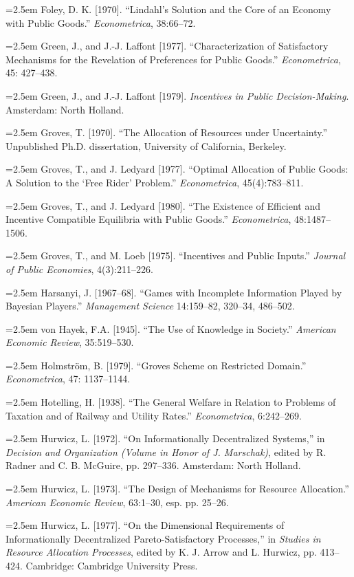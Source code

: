 \documentclass[12pt, letterpaper]{article}
\newcommand{\bibentry}[1]{\noindent\hangindent=2.5em\hangafter=1 \small #1 \par\vspace{0.7em}}
\begin{document}
\bibentry{Foley, D. K. [1970]. ``Lindahl's Solution and the Core of an Economy with Public Goods.'' \textit{Econometrica}, 38:66--72.}

\bibentry{Green, J., and J.-J. Laffont [1977]. ``Characterization of Satisfactory Mechanisms for the Revelation of Preferences for Public Goods.'' \textit{Econometrica}, 45: 427--438.}

\bibentry{Green, J., and J.-J. Laffont [1979]. \textit{Incentives in Public Decision-Making}. Amsterdam: North Holland.}

\bibentry{Groves, T. [1970]. ``The Allocation of Resources under Uncertainty.'' Unpublished Ph.D. dissertation, University of California, Berkeley.}

\bibentry{Groves, T., and J. Ledyard [1977]. ``Optimal Allocation of Public Goods: A Solution to the `Free Rider' Problem.'' \textit{Econometrica}, 45(4):783--811.}

\bibentry{Groves, T., and J. Ledyard [1980]. ``The Existence of Efficient and Incentive Compatible Equilibria with Public Goods.'' \textit{Econometrica}, 48:1487--1506.}

\bibentry{Groves, T., and M. Loeb [1975]. ``Incentives and Public Inputs.'' \textit{Journal of Public Economies}, 4(3):211--226.}

\bibentry{Harsanyi, J. [1967--68]. ``Games with Incomplete Information Played by Bayesian Players.'' \textit{Management Science} 14:159--82, 320--34, 486--502.}

\bibentry{von Hayek, F.A. [1945]. ``The Use of Knowledge in Society.'' \textit{American Economic Review}, 35:519--530.}

\bibentry{Holmström, B. [1979]. ``Groves Scheme on Restricted Domain.'' \textit{Econometrica}, 47: 1137--1144.}


\bibentry{Hotelling, H. [1938]. ``The General Welfare in Relation to Problems of Taxation and of Railway and Utility Rates.'' \textit{Econometrica}, 6:242--269.}

\bibentry{Hurwicz, L. [1972]. ``On Informationally Decentralized Systems,'' in \textit{Decision and Organization (Volume in Honor of J. Marschak)}, edited by R. Radner and C. B. McGuire, pp. 297--336. Amsterdam: North Holland.}

\bibentry{Hurwicz, L. [1973]. ``The Design of Mechanisms for Resource Allocation.'' \textit{American Economic Review}, 63:1--30, esp. pp. 25--26.}

\bibentry{Hurwicz, L. [1977]. ``On the Dimensional Requirements of Informationally Decentralized Pareto-Satisfactory Processes,'' in \textit{Studies in Resource Allocation Processes}, edited by K. J. Arrow and L. Hurwicz, pp. 413--424. Cambridge: Cambridge University Press.}
\end{document}
